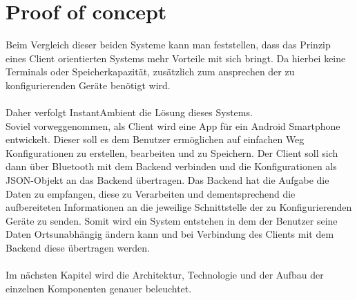 \section{Proof of concept}

Beim Vergleich dieser beiden Systeme kann man feststellen, dass das Prinzip eines Client orientierten Systems mehr Vorteile mit sich bringt. Da hierbei keine Terminals oder Speicherkapazität, zusätzlich zum ansprechen der zu konfigurierenden Geräte benötigt wird. 
\\\\ 
Daher verfolgt InstantAmbient die Lösung dieses Systems. \\
Soviel vorweggenommen, als Client wird eine App für ein Android Smartphone entwickelt. Dieser soll es dem Benutzer ermöglichen auf einfachen Weg Konfigurationen zu erstellen, bearbeiten und zu Speichern. Der Client soll sich dann über Bluetooth mit dem Backend verbinden und die Konfigurationen als JSON-Objekt an das Backend übertragen. Das Backend hat die Aufgabe die Daten zu empfangen, diese zu Verarbeiten und dementsprechend die aufbereiteten Informationen an die jeweilige Schnittstelle der zu Konfigurierenden Geräte zu senden. 
Somit wird ein System entstehen in dem der Benutzer seine Daten Ortsunabhängig ändern kann und bei Verbindung des Clients mit dem Backend diese übertragen werden. 
\\\\
Im nächsten Kapitel wird die Architektur, Technologie und der Aufbau der einzelnen Komponenten genauer beleuchtet.